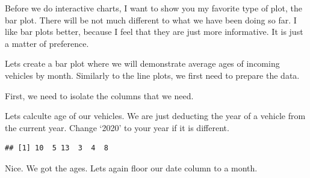 \documentclass[]{book}
\newenvironment{Shaded}{\begin{snugshade}}{\end{snugshade}}
\newcommand{\CommentTok}[1]{\textcolor[rgb]{0.56,0.35,0.01}{\textit{#1}}}
\newcommand{\DecValTok}[1]{\textcolor[rgb]{0.00,0.00,0.81}{#1}}
\newcommand{\KeywordTok}[1]{\textcolor[rgb]{0.13,0.29,0.53}{\textbf{#1}}}
\newcommand{\NormalTok}[1]{#1}
\newcommand{\OperatorTok}[1]{\textcolor[rgb]{0.81,0.36,0.00}{\textbf{#1}}}
\newcommand{\StringTok}[1]{\textcolor[rgb]{0.31,0.60,0.02}{#1}}
\begin{document}
Before we do interactive charts, I want to show you my favorite type of plot, the bar plot. There will be not much different to what we have been doing so far. I like bar plots better, because I feel that they are just more informative. It is just a matter of preference.

Lets create a bar plot where we will demonstrate average ages of incoming vehicles by month. Similarly to the line plots, we first need to prepare the data.

First, we need to isolate the columns that we need.

\begin{Shaded}
\end{Shaded}

Lets calculte age of our vehicles. We are just deducting the year of a vehicle from the current year. Change `2020' to your year if it is different.

\begin{Shaded}
\end{Shaded}

\begin{verbatim}
## [1] 10  5 13  3  4  8
\end{verbatim}

Nice. We got the ages. Lets again floor our date column to a month.

\begin{Shaded}
\end{Shaded}
\end{document}
